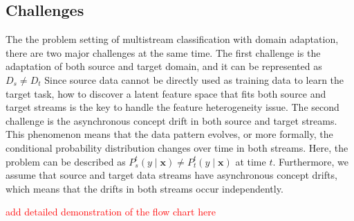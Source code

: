 \subsection{Challenges}
The the problem setting of multistream classification with domain adaptation, there are two major challenges at the same time.
The first challenge is the adaptation of both source and target domain, and it can be represented as $D_{s} \neq D_{t}$
Since source data cannot be directly used as training data to learn the target task, 
how to discover a latent feature space that fits both source and target streams is the key to handle the feature heterogeneity issue.
The second challenge is the asynchronous concept drift in both source and target streams. 
This phenomenon means that the data pattern evolves, or more formally, the conditional probability distribution changes over time in both streams. 
Here, the problem can be described as $P_{s}^{t}(y \mid \mathbf{x}) \neq P_{t}^{t}(y \mid \mathbf{x})$ at time $t$. Furthermore, we assume that source and target data streams have asynchronous concept drifts,
which means that the drifts in both streams occur independently. 

\textcolor{red}{add detailed demonstration of the flow chart here}
